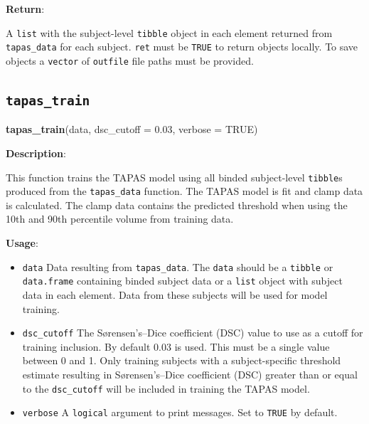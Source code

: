 \documentclass[]{article}
\newenvironment{Shaded}{\begin{snugshade}}{\end{snugshade}}
\newcommand{\DataTypeTok}[1]{\textcolor[rgb]{0.13,0.29,0.53}{#1}}
\newcommand{\FloatTok}[1]{\textcolor[rgb]{0.00,0.00,0.81}{#1}}
\newcommand{\KeywordTok}[1]{\textcolor[rgb]{0.13,0.29,0.53}{\textbf{#1}}}
\newcommand{\NormalTok}[1]{#1}
\newcommand{\OtherTok}[1]{\textcolor[rgb]{0.56,0.35,0.01}{#1}}
\providecommand{\tightlist}{%
  \setlength{\itemsep}{0pt}\setlength{\parskip}{0pt}}
\begin{document}
\textbf{Return}:

A \texttt{list} with the subject-level \texttt{tibble} object in each
element returned from \texttt{tapas\_data} for each subject.
\texttt{ret} must be \texttt{TRUE} to return objects locally. To save
objects a \texttt{vector} of \texttt{outfile} file paths must be
provided.

\hypertarget{tapas_train}{%
\subsection{\texorpdfstring{\texttt{tapas\_train}}{tapas\_train}}\label{tapas_train}}

\begin{Shaded}
\begin{Highlighting}[]
\KeywordTok{tapas_train}\NormalTok{(data, }
            \DataTypeTok{dsc_cutoff =} \FloatTok{0.03}\NormalTok{, }
            \DataTypeTok{verbose =} \OtherTok{TRUE}\NormalTok{)}
\end{Highlighting}
\end{Shaded}

\textbf{Description}:

This function trains the TAPAS model using all binded subject-level
\texttt{tibble}s produced from the \texttt{tapas\_data} function. The
TAPAS model is fit and clamp data is calculated. The clamp data contains
the predicted threshold when using the 10th and 90th percentile volume
from training data.

\textbf{Usage}:

\begin{itemize}
\tightlist
\item
  \texttt{data} Data resulting from \texttt{tapas\_data}. The
  \texttt{data} should be a \texttt{tibble} or \texttt{data.frame}
  containing binded subject data or a \texttt{list} object with subject
  data in each element. Data from these subjects will be used for model
  training.\\
\item
  \texttt{dsc\_cutoff} The Sørensen's--Dice coefficient (DSC) value to
  use as a cutoff for training inclusion. By default 0.03 is used. This
  must be a single value between 0 and 1. Only training subjects with a
  subject-specific threshold estimate resulting in Sørensen's--Dice
  coefficient (DSC) greater than or equal to the \texttt{dsc\_cutoff}
  will be included in training the TAPAS model.\\
\item
  \texttt{verbose} A \texttt{logical} argument to print messages. Set to
  \texttt{TRUE} by default.
\end{itemize}
\end{document}
